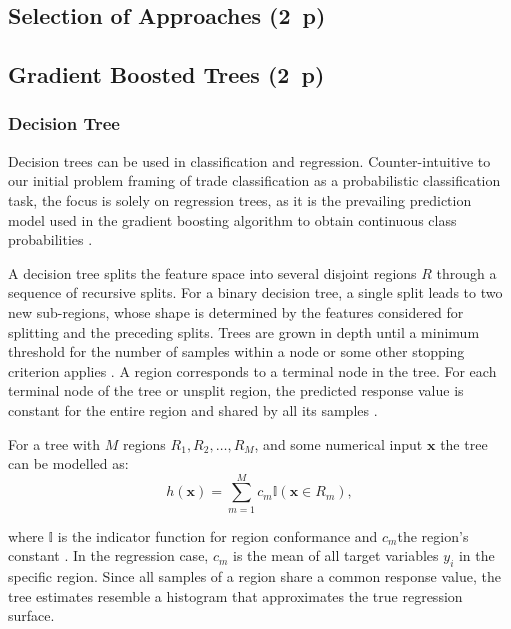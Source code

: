 \subsection{Selection of Approaches (2~p)}\label{sec:selection-of-approaches}



\subsection{Gradient Boosted Trees (2~p)}\label{sec:gradient-boosted-trees}

\subsubsection{Decision Tree}\label{sec:decision-tree}

Decision trees can be used in classification and regression. Counter-intuitive to our initial problem framing of trade classification as a probabilistic classification task, the focus is solely on regression trees, as it is the prevailing prediction model used in the gradient boosting algorithm to obtain continuous class probabilities \autocite[][9]{friedmanAdditiveLogisticRegression2000}.

A decision tree splits the feature space into several disjoint regions $R$ through a sequence of recursive splits. For a binary decision tree, a single split leads to two new sub-regions, whose shape is determined by the features considered for splitting and the preceding splits. Trees are grown in depth until a minimum threshold for the number of samples within a node or some other stopping criterion applies \autocite[][42]{breimanClassificationRegressionTrees2017}.
A region corresponds to a terminal node in the tree. For each terminal node of the tree or unsplit region, the predicted response value is constant for the entire region and shared by all its samples \autocite[][229]{breimanClassificationRegressionTrees2017}.

For a tree with $M$ regions $R_1, R_2,\ldots, R_M$, and some numerical input $\mathbf{x}$ the tree can be modelled as:
\begin{equation}
    h(\mathbf{x})=\sum_{m=1}^{M} c_{m} \mathbb{I}\left(\mathbf{x} \in R_{m}\right),
    \label{eq:decision-tree}
\end{equation}

where $\mathbb{I}$ is the indicator function for region conformance and $c_m$the region's constant \autocite[][326]{hastietrevorElementsStatisticalLearning2009}. In the regression case, $c_m$ is the mean of all target variables $y_i$ in the specific region. Since all samples of a region share a common response value, the tree estimates resemble a histogram that approximates the true regression surface.

